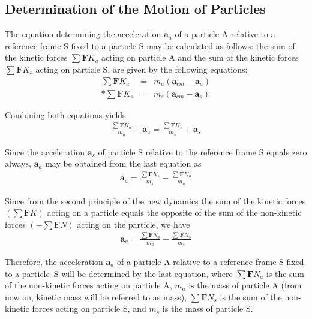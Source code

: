 \documentclass[12pt]{article}
\newcommand{\yN}{\newpage}%
\newcommand{\yS}{\medskip}%
\newcommand{\cA}{\centering}%
\newcommand{\cS}{\cA\subsection}%
\newcommand{\cs}[1]{}%
\newcommand{\vA}{\mathbf{a}}
\newcommand{\vF}{\mathbf{F}}
\newcommand{\nK}{{\scriptstyle K}}
\newcommand{\nN}{{\scriptstyle N}}
\newcommand{\mM}{m}
\newcommand{\ra}{_a}
\newcommand{\rs}{_s}
\newcommand{\rcm}{_{cm}}
\begin{document}
\yS \vspace{-1.5em}

{\cs{Determination of the Motion of Particles}}
{\cS{Determination of the Motion of Particles}}

\par The equation determining the acceleration $\vA\ra$ of a particle A relative to a reference frame S fixed to a particle S may be calculated as follows: the sum of the kinetic forces $\sum \vF\nK\ra$ acting on particle A and the sum of the kinetic forces $\sum \vF\nK\rs$ acting on particle S, are given by the following equations:
\begin{eqnarray*}
\sum \vF\nK\ra & = & \mM\ra(\vA\rcm - \vA\ra) \\*
\sum \vF\nK\rs & = & \mM\rs(\vA\rcm - \vA\rs)
\end{eqnarray*}
\par Combining both equations yields
\begin{eqnarray*}
\frac{\sum \vF\nK\ra}{\mM\ra} + \vA\ra = \frac{\sum \vF\nK\rs}{\mM\rs} + \vA\rs
\end{eqnarray*}
\par Since the acceleration $\vA\rs$ of particle S relative to the reference frame S equals zero always, $\vA\ra$ may be obtained from the last equation as
\begin{eqnarray*}
\vA\ra = \frac{\sum \vF\nK\rs}{\mM\rs} - \frac{\sum \vF\nK\ra}{\mM\ra}
\end{eqnarray*}
\par Since from the second principle of the new dynamics the sum of the kinetic forces $(\sum \vF\nK)$ acting on a particle equals the opposite of the sum of the non-kinetic forces $(-\sum \vF\nN)$ acting on the particle, we have
\begin{eqnarray*}
\vA\ra = \frac{\sum \vF\nN\ra}{\mM\ra} - \frac{\sum \vF\nN\rs}{\mM\rs}
\end{eqnarray*}
\par Therefore, the acceleration $\vA\ra$ of a particle A relative to a reference frame S fixed to a \hbox {particle S} will be determined by the last equation, where $\sum \vF\nN\ra$ is the sum of the non-kinetic forces acting on particle A, $\mM\ra$ is the mass of particle A (from now on, kinetic mass will be referred to as mass), $\sum \vF\nN\rs$ is the sum of the non-kinetic forces acting on particle S, and $\mM\rs$ is the mass of particle S.

\yN \baselineskip=14.5pt \enlargethispage{0em}

\yS \vspace{0em}
\end{document}
